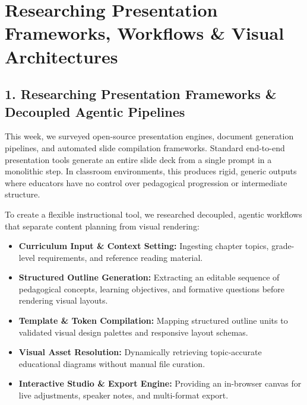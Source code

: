 \documentclass[10pt]{article}
\begin{document}
\section*{Researching Presentation Frameworks, Workflows \& Visual Architectures}

\subsection*{1. Researching Presentation Frameworks \& Decoupled Agentic Pipelines}

This week, we surveyed open-source presentation engines, document generation pipelines, and automated slide compilation frameworks. Standard end-to-end presentation tools generate an entire slide deck from a single prompt in a monolithic step. In classroom environments, this produces rigid, generic outputs where educators have no control over pedagogical progression or intermediate structure.

To create a flexible instructional tool, we researched decoupled, agentic workflows that separate content planning from visual rendering:
\begin{itemize}[leftmargin=1.5em, itemsep=0.25em]
    \item \textbf{Curriculum Input \& Context Setting:} Ingesting chapter topics, grade-level requirements, and reference reading material.
    \item \textbf{Structured Outline Generation:} Extracting an editable sequence of pedagogical concepts, learning objectives, and formative questions before rendering visual layouts.
    \item \textbf{Template \& Token Compilation:} Mapping structured outline units to validated visual design palettes and responsive layout schemas.
    \item \textbf{Visual Asset Resolution:} Dynamically retrieving topic-accurate educational diagrams without manual file curation.
    \item \textbf{Interactive Studio \& Export Engine:} Providing an in-browser canvas for live adjustments, speaker notes, and multi-format export.
\end{itemize}

\vspace{0.15cm}
\end{document}
